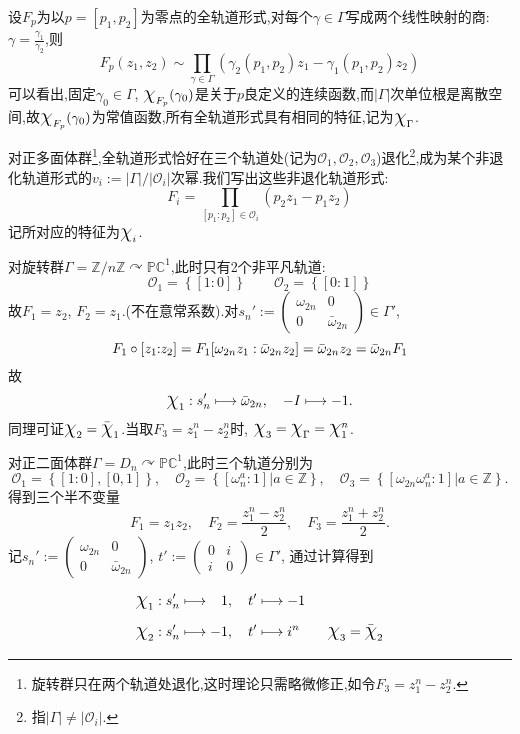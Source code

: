 设$F_p$为以$p=[p_1,p_2]$为零点的全轨道形式,对每个$\gamma \in \Gamma$写成两个线性映射的商: $\gamma=\frac{\gamma_1}{\gamma_2}$,则
$$F_p(z_1,z_2) \sim \prod_{\gamma \in \Gamma}\left(\gamma_2(p_1,p_2)z_1-\gamma_1(p_1,p_2)z_2\right)$$
可以看出,固定$\gamma_0 \in \Gamma$, $\mbox{\Large$\chi$}_{F_p}(\gamma_0)$是关于$p$良定义的连续函数,而$|\Gamma|$次单位根是离散空间,故$\mbox{\Large$\chi$}_{F_p}(\gamma_0)$为常值函数,所有全轨道形式具有相同的特征,记为$\mbox{\Large$\chi$}_{\Gamma}$.

对正多面体群\footnote{旋转群只在两个轨道处退化,这时理论只需略微修正,如令$F_3=z_1^n-z_2^n$.},全轨道形式恰好在三个轨道处(记为$\mathcal{O}_1,\mathcal{O}_2,\mathcal{O}_3$)退化\footnote{指$|\Gamma| \neq |\mathcal{O}_i|$.},成为某个非退化轨道形式的$v_i:=|\Gamma|/|\mathcal{O}_i|$次幂.我们写出这些非退化轨道形式:
$$F_i= \prod_{[p_1:p_2] \in \mathcal{O}_i}(p_2z_1-p_1z_2)$$
记所对应的特征为$\mbox{\Large$\chi$}_i$.
\begin{example1}
	对旋转群$\Gamma=\mathbb{Z}/n\mathbb{Z} \curvearrowright \mathbb{PC}^1$,此时只有2个非平凡轨道:
	$$\mathcal{O}_1=\left\{[1:0] \right\} \qquad \mathcal{O}_2=\left\{[0:1] \right\}$$
	故$F_1=z_2$, $F_2=z_1$.(不在意常系数).对$s_{n}':=\begin{pmatrix}
	\omega_{2n} & 0 \\ 0 & \bar{\omega}_{2n}
	\end{pmatrix} \in \Gamma'$, 
	$$F_1 \circ [z_1\hspace{-3pt}:\hspace{-3pt}z_2] =F_1[\omega_{2n}z_1 : \bar{\omega}_{2n} z_2] = \bar{\omega}_{2n} z_2=\bar{\omega}_{2n} F_1$$
	故$$\mbox{\Large$\chi$}_1:s_n' \longmapsto \bar{\omega}_{2n}, \quad -I \longmapsto -1. $$
	同理可证$\mbox{\Large$\chi$}_2=\bar{\mbox{\Large$\chi$}}_1$.当取$F_3=z_1^n-z_2^n$时, $\mbox{\Large$\chi$}_3=\mbox{\Large$\chi$}_{\Gamma}=\mbox{\Large$\chi$}_1^n$.
\end{example1}
\begin{example1}
	对正二面体群$\Gamma=D_{n} \curvearrowright \mathbb{PC}^1$,此时三个轨道分别为
	\begin{equation*}
	\mathcal{O}_1=\left\{ [1:0], [0,1] \right\}, \quad
	\mathcal{O}_2=\left\{ [\omega_{n}^a:1] \big| a \in \mathbb{Z} \right\}, \quad
	\mathcal{O}_3=\left\{ [\omega_{2n}\omega_{n}^a:1] \big| a \in \mathbb{Z} \right\} .
	\end{equation*}
	得到三个半不变量
	$$F_1=z_1z_2, \quad F_2=\frac{z_1^n-z_2^n}{2}, \quad F_3=\frac{z_1^n+z_2^n}{2}. $$
	记$s_{n}':=\begin{pmatrix}
	\omega_{2n} & 0 \\ 0 & \bar{\omega}_{2n}
	\end{pmatrix}$, $t':=\begin{pmatrix}
	0 & i \\ i & 0
	\end{pmatrix} \in \Gamma'$, 通过计算得到
	\begin{equation*}
	\begin{aligned}
	&\mbox{\Large$\chi$}_1:s_n' \longmapsto \phantom{-}1, \quad t' \longmapsto -1\\
	&\mbox{\Large$\chi$}_2:s_n' \longmapsto -1, \quad t' \longmapsto i^n \qquad \mbox{\Large$\chi$}_3=\bar{\mbox{\Large$\chi$}}_2
	\end{aligned}
	\end{equation*}
\end{example1}
